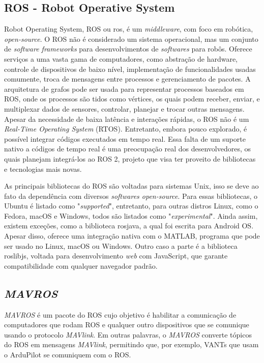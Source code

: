 \documentclass[12pt,a4paper,oneside]{book}
\begin{document}
\subsection{ROS - Robot Operative System}

Robot Operating System, ROS ou ros, é um \textit{middleware}, 
com foco em robótica, \textit{open-source}. O ROS não é considerado 
um sistema operacional, mas um conjunto de \textit{software 
frameworks} para desenvolvimentos de \textit{softwares} para robôs. 
Oferece serviços a uma vasta gama de computadores, 
como abstração de hardware, controle de dispositivos 
de baixo nível, implementação de funcionalidades usadas 
comumente, troca de mensagens entre processos e 
gerenciamento de pacotes. A arquitetura de grafos 
pode ser usada para representar processos baseados 
em ROS, onde os processos são tidos como vértices, 
os quais podem receber, enviar, e multiplexar 
dados de sensores, controlar, planejar e trocar 
outras mensagens. Apesar da necessidade de baixa latência
e interações rápidas, o ROS não é um \textit{Real-Time
Operating System} (RTOS). Entretanto, embora pouco explorado,
é possível integrar códigos executados em tempo real.
Essa falta de um suporte nativo a códigos de tempo real é
uma preocupação real dos desenvolvedores, os quais planejam 
integrá-los ao ROS 2, projeto que visa ter proveito de 
bibliotecas e tecnologias mais novas. 

As principais bibliotecas do ROS são voltadas para sistemas
Unix, isso se deve ao fato da dependência com diversos
\textit{softwares open-source}. Para essas bibliotecas,
o Ubuntu é listado como "\textit{supported}", entretanto,
para outras distros Linux, como o Fedora, macOS e Windows,
todos são listados como "\textit{experimental}". Ainda assim,
existem exceções, como a biblioteca rosjava, a qual foi 
escrita para Android OS. Apesar disso, oferece uma integração
nativa com o MATLAB, programa que pode ser usado no Linux,
macOS ou Windows. Outro caso a parte é a biblioteca roslibjs,
voltada para desenvolvimento \textit{web} com JavaScript,
que garante compatibilidade com qualquer navegador padrão.


\subsection{\textit{MAVROS}}

\textit{MAVROS} é um pacote do ROS cujo objetivo é habilitar a comunicação de computadores que rodam ROS e qualquer outro dispositivos que se comunique usando o protocolo \textit{MAVlink}. Em outras palavras, o \textit{MAVROS} converte tópicos do ROS em mensagens \textit{MAVlink}, permitindo que, por exemplo, VANTs que usam o ArduPilot se comuniquem com o ROS.  \cite{mavros}
\end{document}
